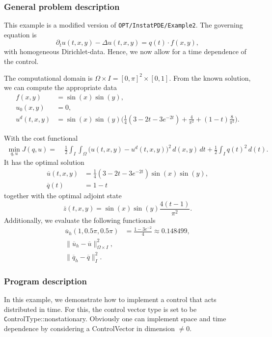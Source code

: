 \subsubsection{General problem description}

This example is a modified version of \texttt{OPT/InstatPDE/Example2}. 
The governing equation is
\begin{equation*}
\partial_t u(t,x,y) - \Delta u(t,x,y) = q(t)\cdot f(x,y),
\end{equation*}
with homogeneous Dirichlet-data. Hence, we now allow for a time dependence of the control. 

The computational domain is $\Omega \times I = [0,\pi]^2 \times [0,1]$. From the known solution, we can compute the appropriate data 
\begin{align*}
f(x,y) &= \sin(x)\sin(y),\\
u_0(x,y) &= 0,\\
u^d(t,x,y)&= \sin(x)\sin(y) \bigl(\tfrac{1}{4}(3-2t-3e^{-2t}) + \tfrac{4}{\pi^2} + (1-t)\tfrac{8}{\pi^2}\bigr).
\end{align*}

With the cost functional 
\begin{align*}
 \min_{q,u} J(q,u) =&\; \frac{1}{2}\int_I\int_{\Omega} \bigl(u(t,x,y) - u^d(t,x,y)\bigr)^2\,d(x,y)\,dt + \frac{1}{2} \int_{I} q(t)^2\,d(t).
\end{align*}
It has the optimal solution 
\begin{align*}
\overline{u}(t,x,y) &= \tfrac{1}{4}(3-2t-3e^{-2t})\sin(x) \sin(y),\\
\overline{q}(t) &= 1-t 
\end{align*}
together with the optimal adjoint state 
\[
 \overline{z}(t,x,y) = \sin(x) \sin(y) \frac{4(t-1)}{\pi^2}.
\]
Additionally, we evaluate the following functionals
\begin{align*}
  \overline{u}_h(1,0.5\pi,0.5\pi) &= \frac{1-3e^{-2}}{4} \approx 0.148499,\\
  \| \overline{u}_h - \overline{u}\|^2_{\Omega \times I},& \\
  \| \overline{q}_h - \overline{q}\|^2_I. &  
\end{align*}

\subsubsection{Program description}
In this example, we demonstrate how to implement a control that acts distributed in time. 
For this, the control vector type is set to be 
{\texttt ControlType::nonstationary}. 
Obviously one can implement space and time dependence by considering a ControlVector in
dimension $\ne 0$.
